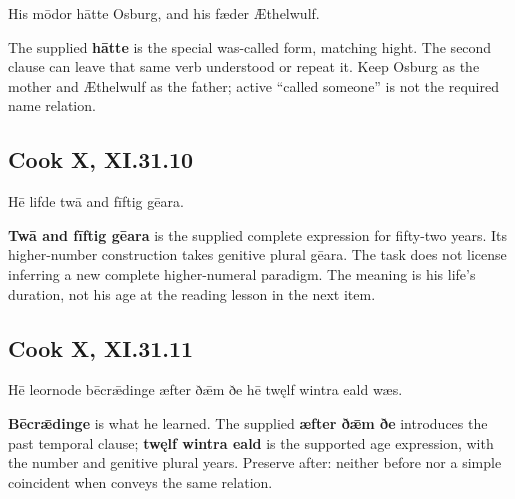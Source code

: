 \par\begin{minipage}{\linewidth}\raggedright
His mōdor hātte Osburg, and his fæder Æthelwulf.

The supplied \textbf{hātte} is the special was-called form, matching hight. The second clause can leave that same verb understood or repeat it. Keep Osburg as the mother and Æthelwulf as the father; active “called someone” is not the required name relation.

\end{minipage}\par\addvspace{4pt}

\subsection*{Cook X, XI.31.10}

\par\begin{minipage}{\linewidth}\raggedright
Hē lifde twā and fīftig gēara.

\textbf{Twā and fīftig gēara} is the supplied complete expression for fifty-two years. Its higher-number construction takes genitive plural gēara. The task does not license inferring a new complete higher-numeral paradigm. The meaning is his life’s duration, not his age at the reading lesson in the next item.

\end{minipage}\par\addvspace{4pt}

\subsection*{Cook X, XI.31.11}

\par\begin{minipage}{\linewidth}\raggedright
Hē leornode bēcrǣdinge æfter ðǣm ðe hē twęlf wintra eald wæs.

\textbf{Bēcrǣdinge} is what he learned. The supplied \textbf{æfter ðǣm ðe} introduces the past temporal clause; \textbf{twęlf wintra eald} is the supported age expression, with the number and genitive plural years. Preserve after: neither before nor a simple coincident when conveys the same relation.

\end{minipage}\par\addvspace{4pt}

